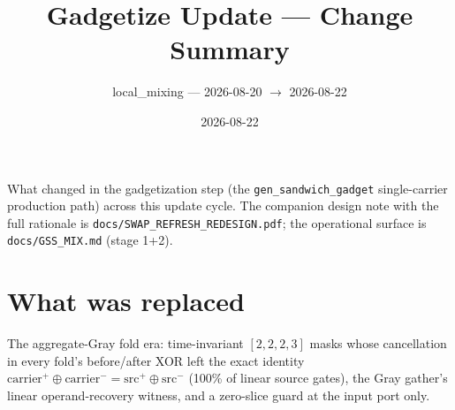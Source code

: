 \documentclass[11pt]{article}
\title{Gadgetize Update --- Change Summary}
\author{local\_mixing --- 2026-08-20 $\to$ 2026-08-22}
\date{2026-08-22}
\begin{document}
\maketitle

\noindent What changed in the gadgetization step (the
\texttt{gen\_sandwich\_gadget} single-carrier production path) across
this update cycle. The companion design note with the full rationale is
\texttt{docs/SWAP\_REFRESH\_REDESIGN.pdf}; the operational surface is
\texttt{docs/GSS\_MIX.md} (stage 1+2).

\section{What was replaced}
The aggregate-Gray fold era: time-invariant $[2,2,2,3]$ masks whose
cancellation in every fold's before/after XOR left the exact identity
$\mathrm{carrier}^{+} \oplus \mathrm{carrier}^{-} = \mathrm{src}^{+}
\oplus \mathrm{src}^{-}$ (100\% of linear source gates), the Gray
gather's linear operand-recovery witness, and a zero-slice guard at the
input port only.
\end{document}
